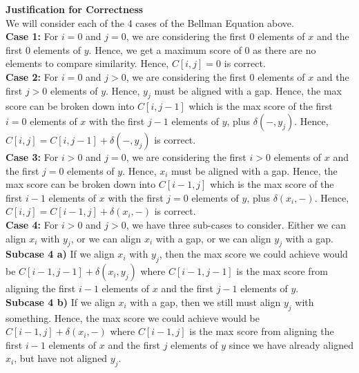 \documentclass[12pt]{article}
\begin{document}
\textbf{Justification for Correctness} \\

We will consider each of the 4 cases of the Bellman Equation above. \\

\textbf{Case 1:} For $i = 0$ and $j = 0$, we are considering the first 0 elements of $x$ and the first $0$ elements of $y$. Hence, we get a maximum score of $0$ as there are no elements to compare similarity. Hence, $C[i,j] = 0$ is correct. \\

\textbf{Case 2:} For $i = 0$ and $j > 0$, we are considering the first 0 elements of $x$ and the first $j > 0$ elements of $y$. Hence, $y_j$ must be aligned with a gap. Hence, the max score can be broken down into $C[i, j-1]$ which is the max score of the first $i = 0$ elements of $x$ with the first $j - 1$ elements of $y$, plus $\delta(-,y_j)$. Hence, $C[i,j] = C[i,j-1] + \delta(-,y_j)$ is correct. \\

\textbf{Case 3:} For $i > 0$ and $j = 0$, we are considering the first $i > 0$ elements of $x$ and the first $j = 0$ elements of $y$. Hence, $x_i$ must be aligned with a gap. Hence, the max score can be broken down into $C[i-1, j]$ which is the max score of the first $i-1$ elements of $x$ with the first $j=0$ elements of $y$, plus $\delta(x_i,-)$. Hence, $C[i,j] = C[i-1, j] + \delta(x_i,-)$ is correct. \\

\textbf{Case 4:} For $i > 0$ and $j > 0$, we have three sub-cases to consider. Either we can align $x_i$ with $y_j$, or we can align $x_i$ with a gap, or we can align $y_j$ with a gap. \\

\textbf{Subcase 4 a)} If we align $x_i$ with $y_j$, then the max score we could achieve would be $C[i-1,j-1] + \delta(x_i,y_j)$ where $C[i-1,j-1]$ is the max score from aligning the first $i-1$ elements of $x$ and the first $j-1$ elements of $y$. \\

\textbf{Subcase 4 b)} If we align $x_i$ with a gap, then we still must align $y_j$ with something. Hence, the max score we could achieve would be $C[i-1, j] + \delta(x_i,-)$ where $C[i-1, j]$ is the max score from aligning the first $i-1$ elements of $x$ and the first $j$ elements of $y$ since we have already aligned $x_i$, but have not aligned $y_j$. \\
\end{document}
